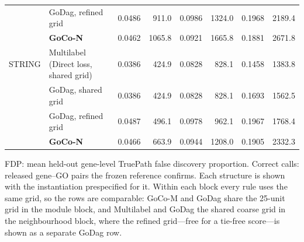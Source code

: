 \begin{table}[!t]
\begin{tabular}{ll rr rr rr}
 & GoDag, refined grid & 0.0486 & 911.0 & 0.0986 & 1324.0 & 0.1968 & 2189.4 \\
 & \textbf{GoCo-N} & 0.0462 & 1065.8 & 0.0921 & 1665.8 & 0.1881 & 2671.8 \\
\addlinespace[2pt]
STRING & Multilabel (Direct loss, shared grid) & 0.0386 & 424.9 & 0.0828 & 828.1 & 0.1458 & 1383.8 \\
 & GoDag, shared grid & 0.0386 & 424.9 & 0.0828 & 828.1 & 0.1693 & 1562.5 \\
 & GoDag, refined grid & 0.0487 & 496.1 & 0.0978 & 962.1 & 0.1967 & 1768.4 \\
 & \textbf{GoCo-N} & 0.0466 & 663.9 & 0.0944 & 1208.0 & 0.1905 & 2332.3 \\
\bottomrule
\end{tabular}
\par\vspace{3pt}\begin{minipage}{\linewidth}\footnotesize FDP: mean held-out gene-level TruePath false discovery proportion. Correct calls: released gene--GO pairs the frozen reference confirms. Each structure is shown with the instantiation prespecified for it. Within each block every rule uses the same grid, so the rows are comparable: GoCo-M and GoDag share the 25-unit grid in the module block, and Multilabel and GoDag the shared coarse grid in the neighbourhood block, where the refined grid---free for a tie-free score---is shown as a separate GoDag row.\end{minipage}
\end{table}
